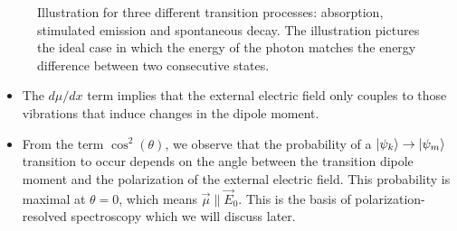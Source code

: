 \begin{figure}[t!]
		\caption{Illustration for three different transition processes: absorption, stimulated emission and spontaneous decay. The illustration pictures the ideal case in which the energy of the photon matches the energy difference between two consecutive states.}
		\label{dia2}			
	\end{figure}
\begin{itemize}
	\item {The $d \mu / d x$ term implies that the external electric field only couples to those vibrations that induce changes in the dipole moment.}
	\item {From the term $\cos^2 (\theta)$, we observe that the probability of a $\ket{\psi_k} \to \ket{\psi_m}$ transition to occur depends on the angle between the transition dipole moment and the polarization of the external electric field. This probability is maximal at $\theta = 0$, which means $ \vec{\mu} \parallel \vec{E}_0$. This is the basis of polarization-resolved spectroscopy which we will discuss later.}
\end{itemize}


